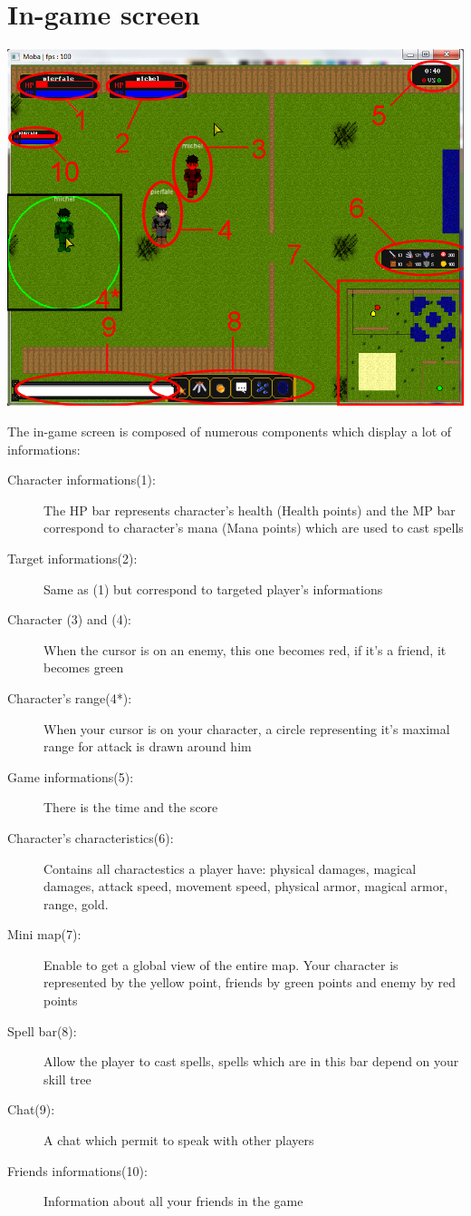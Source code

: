 \documentclass{scrreprt}
\begin{document}
		  \section{In-game screen}
		  \begin{center}
		  \includegraphics[scale=0.4]{in_game.png}
		  \end{center}
		  The in-game screen is composed of numerous components which display a lot of informations:
		  \begin{description}
		  \item[Character informations(1):]{The HP bar represents character's health (Health points) and the MP bar correspond to character's mana (Mana points) which are used to cast spells}
		  \item[Target informations(2):]{Same as (1) but correspond to targeted player's informations}
		  \item[Character (3) and (4):]{When the cursor is on an enemy, this one becomes red, if it's a friend, it becomes green}
		  \item[Character's range(4*):]{When your cursor is on your character, a circle representing it's maximal range for attack is drawn around him}
		  \item[Game informations(5):]{There is the time and the score}
		  \item[Character's characteristics(6):]{Contains all charactestics a player have: physical damages, magical damages, attack speed, movement speed, physical armor, magical armor, range, gold.}
		  \item[Mini map(7):]{Enable to get a global view of the entire map. Your character is represented by the yellow point, friends by green points and enemy by red points}
		  \item[Spell bar(8):]{Allow the player to cast spells, spells which are in this bar depend on your skill tree}
		  \item[Chat(9):]{A chat which permit to speak with other players}
		  \item[Friends informations(10):]{Information about all your friends in the game}
		  \end{description}
\end{document}
